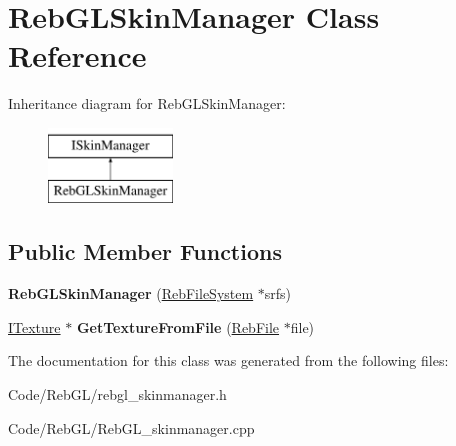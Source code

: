 \hypertarget{class_reb_g_l_skin_manager}{}\section{Reb\+G\+L\+Skin\+Manager Class Reference}
\label{class_reb_g_l_skin_manager}
Inheritance diagram for Reb\+G\+L\+Skin\+Manager\+:\begin{figure}[H]
\begin{center}
\leavevmode
\includegraphics[height=2.000000cm]{class_reb_g_l_skin_manager}
\end{center}
\end{figure}
\subsection*{Public Member Functions}
\begin{DoxyCompactItemize}
\item 
{\bfseries Reb\+G\+L\+Skin\+Manager} (\hyperlink{class_reb_file_system}{Reb\+File\+System} $\ast$srfs)\hypertarget{class_reb_g_l_skin_manager_af84ddd67d922018cabc7781beee60f49}{}\label{class_reb_g_l_skin_manager_af84ddd67d922018cabc7781beee60f49}

\item 
\hyperlink{class_i_texture}{I\+Texture} $\ast$ {\bfseries Get\+Texture\+From\+File} (\hyperlink{class_reb_file}{Reb\+File} $\ast$file)\hypertarget{class_reb_g_l_skin_manager_ade212c012daf2e428e0e6502bd385447}{}\label{class_reb_g_l_skin_manager_ade212c012daf2e428e0e6502bd385447}

\end{DoxyCompactItemize}


The documentation for this class was generated from the following files\+:\begin{DoxyCompactItemize}
\item 
Code/\+Reb\+G\+L/rebgl\+\_\+skinmanager.\+h\item 
Code/\+Reb\+G\+L/Reb\+G\+L\+\_\+skinmanager.\+cpp\end{DoxyCompactItemize}
